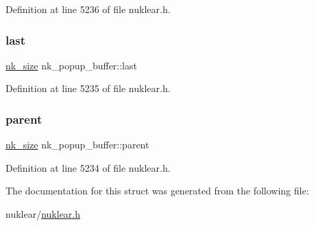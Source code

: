 Definition at line 5236 of file nuklear.\+h.

\mbox{\label{structnk__popup__buffer_ab4c3e21e03a4428e92d375efe384add0}} 
\subsubsection{\texorpdfstring{last}{last}}
{\footnotesize\ttfamily \mbox{\hyperlink{nuklear_8h_a84c0fc50dec5501be327b33d41d9010c}{nk\+\_\+size}} nk\+\_\+popup\+\_\+buffer\+::last}



Definition at line 5235 of file nuklear.\+h.

\mbox{\label{structnk__popup__buffer_aff97e8d18ec464a77bf28be1b9f54bf7}} 
\subsubsection{\texorpdfstring{parent}{parent}}
{\footnotesize\ttfamily \mbox{\hyperlink{nuklear_8h_a84c0fc50dec5501be327b33d41d9010c}{nk\+\_\+size}} nk\+\_\+popup\+\_\+buffer\+::parent}



Definition at line 5234 of file nuklear.\+h.



The documentation for this struct was generated from the following file\+:\begin{DoxyCompactItemize}
\item 
nuklear/\mbox{\hyperlink{nuklear_8h}{nuklear.\+h}}\end{DoxyCompactItemize}
